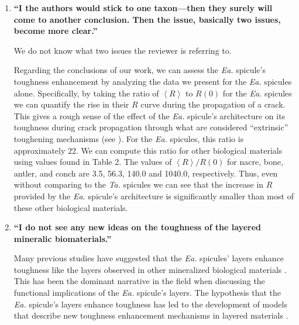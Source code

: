 \documentclass[11pt,letterpaper]{report}
\makeatletter
\newcommand{\TA}{\textit{Ta.\@}\xspace}
\newcommand{\EA}{\textit{Ea.\@}\xspace}
\makeatother
\begin{document}
\begin{enumerate}[label=\textit{3.\arabic*},wide, labelwidth=!, labelindent=0pt]
We agree with the Reviewer that differences in spiculogenesis between hexactinellids and demosponges will cause structural differences between the \EA and \TA spicules. We believe that this work constitutes a substantial improvement over past works focusing on toughness because it is the first to compare the \EA spicules to spicules from a related sponge instead of to synthetic glass. We hope that this work will motivate the importance of continuing to seek better control materials for comparison, such as sections of the \EA spicule core.

\item \label{r3c3} {\bf ``I the authors would stick to one taxon---then they surely will come to another conclusion. Then the issue, basically two issues, become more clear.''}

We do not know what two issues the reviewer is referring to. 

Regarding the conclusions of our work, we can assess the \EA spicule's toughness enhancement by analyzing the data we present for the \EA spicules alone. Specifically, by taking the ratio of $\left< R\right>$ to $R(0)$ for the \EA spicules we can quantify the rise in their $R$ curve during the propagation of a crack. This gives a rough sense of the effect of the \EA spicule's architecture on its toughness during crack propagation through what are considered ``extrinsic'' toughening mechanisms (see \cite{evans1990perspective}). For the \EA spicules, this ratio is approximately 22. We can compute this ratio for other biological materials using values found in Table 2. The values of $\left< R\right>/R(0)$ for nacre, bone, antler, and conch are 3.5, 56.3, 140.0 and 1040.0, respectively. Thus, even without comparing to the \TA spicules we can see that the increase in $R$ provided by the \EA spicule's architecture is significantly smaller than most of these other biological materials.

\item \label{r3c4} {\bf ``I do not see any new ideas on the toughness of the layered mineralic biomaterials.''}

Many previous studies have suggested that the \EA spicules' layers enhance toughness like the layers observed in other mineralized biological materials \cite{mayer2011new, mayer2005rigid, walter2007mechanisms, kolednik2011bioinspired}. This has been the dominant narrative in the field when discussing the functional implications of the \EA spicule's layers. The hypothesis that the \EA spicule's layers enhance toughness has led to the development of models that describe new toughness enhancement mechanisms in layered materials \cite{kolednik2014improvements, kolednik2011bioinspired, fratzl2007hindered}. 


\end{enumerate}
\end{document}
